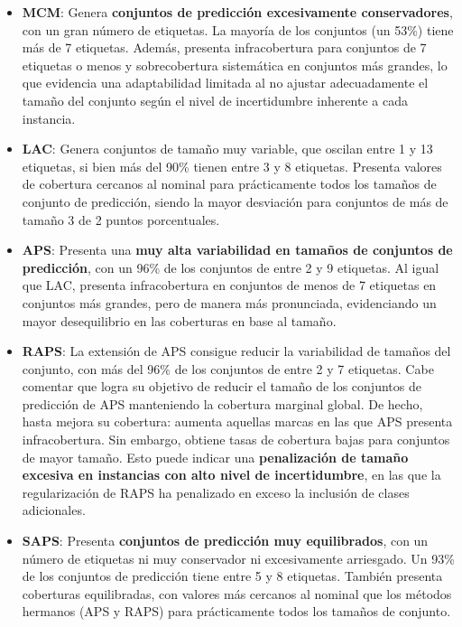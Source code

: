 \begin{itemize}
    
    \item \textbf{MCM}: Genera \textbf{conjuntos de predicción excesivamente conservadores}, con un gran número de etiquetas. La mayoría de los conjuntos (un 53\%) tiene más de 7 etiquetas. Además, presenta infracobertura para conjuntos de 7 etiquetas o menos y sobrecobertura sistemática en conjuntos más grandes, lo que evidencia una adaptabilidad limitada al no ajustar adecuadamente el tamaño del conjunto según el nivel de incertidumbre inherente a cada instancia. 
    
    \item \textbf{LAC}: Genera conjuntos de tamaño muy variable, que oscilan entre 1 y 13 etiquetas, si bien más del 90\% tienen entre 3 y 8 etiquetas. Presenta valores de cobertura cercanos al nominal para prácticamente todos los tamaños de conjunto de predicción, siendo la mayor desviación para conjuntos de más de tamaño 3 de 2 puntos porcentuales. 

    \item \textbf{APS}: Presenta una \textbf{muy alta variabilidad en tamaños de conjuntos de predicción}, con un 96\% de los conjuntos de entre 2 y 9 etiquetas. Al igual que LAC, presenta infracobertura en conjuntos de menos de 7 etiquetas en conjuntos más grandes, pero de manera más pronunciada, evidenciando un mayor desequilibrio en las coberturas en base al tamaño.%
    
    \item \textbf{RAPS}: La extensión de APS consigue reducir la variabilidad de tamaños del conjunto, con más del 96\% de los conjuntos de entre 2 y 7 etiquetas. Cabe comentar que logra su objetivo de reducir el tamaño de los conjuntos de predicción de APS manteniendo la cobertura marginal global. De hecho, hasta mejora su cobertura: aumenta aquellas marcas en las que APS presenta infracobertura. Sin embargo, obtiene tasas de cobertura bajas para conjuntos de mayor tamaño. Esto puede indicar una \textbf{penalización de tamaño excesiva en instancias con alto nivel de incertidumbre}, en las que la regularización de RAPS ha penalizado en exceso la inclusión de clases adicionales.
    
    \item \textbf{SAPS}: Presenta \textbf{conjuntos de predicción muy equilibrados}, con un número de etiquetas ni muy conservador ni excesivamente arriesgado. Un 93\% de los conjuntos de predicción tiene entre 5 y 8 etiquetas. También presenta coberturas equilibradas, con valores más cercanos al nominal que los métodos hermanos (APS y RAPS) para prácticamente todos los tamaños de conjunto. 
    
\end{itemize}


